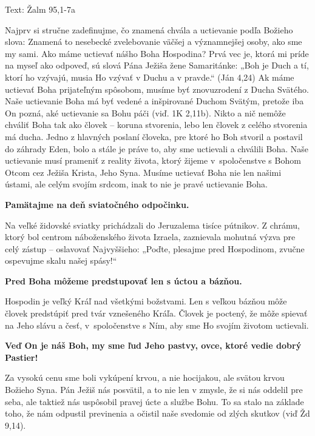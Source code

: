 

Text: Žalm 95,1-7a

Najprv si stručne zadefinujme, čo znamená chvála a uctievanie podľa Božieho slova: Znamená to nesebecké zvelebovanie väčšej a významnejšej osoby, ako sme my sami. Ako máme uctievať nášho Boha Hospodina? Prvá vec je, ktorá mi príde na myseľ ako odpoveď, sú slová Pána Ježiša žene Samaritánke: „Boh je Duch a tí, ktorí ho vzývajú, musia Ho vzývať v Duchu a v pravde.“ (Ján 4,24) Ak máme uctievať Boha prijateľným spôsobom, musíme byť znovuzrodení z Ducha Svätého. Naše uctievanie Boha má byť vedené a inšpirované Duchom Svätým, pretože iba On pozná, aké uctievanie sa Bohu páči (viď. 1K 2,11b). Nikto a nič nemôže chváliť Boha tak ako človek -- koruna stvorenia, lebo len človek z celého stvorenia má ducha. Jedno z hlavných poslaní človeka, pre ktoré ho Boh stvoril a postavil do záhrady Eden, bolo a stále je práve to, aby sme uctievali a chválili Boha. Naše uctievanie musí prameniť z reality života, ktorý žijeme v~spoločenstve s Bohom Otcom cez Ježiša Krista, Jeho Syna. Musíme uctievať Boha nie len našimi ústami, ale celým svojím srdcom, inak to nie je pravé uctievanie Boha.

{\bf Pamätajme na deň sviatočného odpočinku.}

Na veľké židovské sviatky prichádzali do Jeruzalema tisíce pútnikov. Z chrámu, ktorý bol centrom náboženského života Izraela, zaznievala mohutná výzva pre celý zástup -- oslavovať Najvyššieho: „Poďte, plesajme pred Hospodinom, zvučne ospevujme skalu našej spásy!“

{\bf Pred Boha môžeme predstupovať len s úctou a bázňou.}

Hospodin je veľký Kráľ nad všetkými božstvami. Len s veľkou bázňou môže človek predstúpiť pred tvár vznešeného Kráľa. Človek je poctený, že môže spievať na Jeho slávu a česť, v~spoločenstve s Ním, aby sme Ho svojím životom uctievali.

{\bf Veď On je náš Boh, my sme ľud Jeho pastvy, ovce, ktoré vedie dobrý Pastier!}

Za vysokú cenu sme boli vykúpení krvou, a nie hocijakou, ale svätou krvou Božieho Syna. Pán Ježiš nás posvätil, a to nie len v zmysle, že si nás oddelil pre seba, ale taktiež nás uspôsobil pravej úcte a službe Bohu. To sa stalo na základe toho, že nám odpustil previnenia a očistil naše svedomie od zlých skutkov (viď Žd 9,14).

